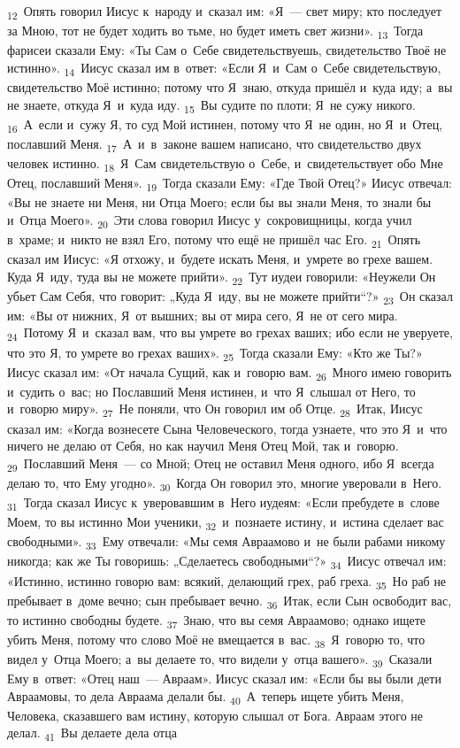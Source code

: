 \documentclass[a4paper,12pt]{article}
\begin{document}
\textsubscript{12}~Опять говорил Иисус к~народу и~сказал им: «Я~--- свет миру; кто последует за Мною, тот не будет ходить во тьме, но будет иметь свет жизни». \textsubscript{13}~Тогда фарисеи сказали Ему: «Ты Сам о~Себе свидетельствуешь, свидетельство Твоё не истинно». \textsubscript{14}~Иисус сказал им в~ответ: «Если Я~и~Сам о~Себе свидетельствую, свидетельство Моё истинно; потому что Я~знаю, откуда пришёл и~куда иду; а~вы не знаете, откуда Я~и~куда иду. \textsubscript{15}~Вы судите по плоти; Я~не сужу никого. \textsubscript{16}~А~если и~сужу Я, то суд Мой истинен, потому что Я~не один, но Я~и~Отец, пославший Меня. \textsubscript{17}~А~и~в~законе вашем написано, что свидетельство двух человек истинно. \textsubscript{18}~Я~Сам свидетельствую о~Себе, и~свидетельствует обо Мне Отец, пославший Меня». \textsubscript{19}~Тогда сказали Ему: «Где Твой Отец?» Иисус отвечал: «Вы не знаете ни Меня, ни Отца Моего; если бы вы знали Меня, то знали бы и~Отца Моего». \textsubscript{20}~Эти слова говорил Иисус у~сокровищницы, когда учил в~храме; и~никто не взял Его, потому что ещё не пришёл час Его. \textsubscript{21}~Опять сказал им Иисус: «Я отхожу, и~будете искать Меня, и~умрете во грехе вашем. Куда Я~иду, туда вы не можете прийти». \textsubscript{22}~Тут иудеи говорили: «Неужели Он убьет Сам Себя, что говорит: „Куда Я~иду, вы не можете прийти“?» \textsubscript{23}~Он сказал им: «Вы от нижних, Я~от вышних; вы от мира сего, Я~не от сего мира. \textsubscript{24}~Потому Я~и~сказал вам, что вы умрете во грехах ваших; ибо если не уверуете, что это Я, то умрете во грехах ваших». \textsubscript{25}~Тогда сказали Ему: «Кто же Ты?» Иисус сказал им: «От начала Сущий, как и~говорю вам. \textsubscript{26}~Много имею говорить и~судить о~вас; но Пославший Меня истинен, и~что Я~слышал от Него, то и~говорю миру». \textsubscript{27}~Не поняли, что Он говорил им об Отце. \textsubscript{28}~Итак, Иисус сказал им: «Когда вознесете Сына Человеческого, тогда узнаете, что это Я~и~что ничего не делаю от Себя, но как научил Меня Отец Мой, так и~говорю. \textsubscript{29}~Пославший Меня~--- со Мной; Отец не оставил Меня одного, ибо Я~всегда делаю то, что Ему угодно». \textsubscript{30}~Когда Он говорил это, многие уверовали в~Него. \textsubscript{31}~Тогда сказал Иисус к~уверовавшим в~Него иудеям: «Если пребудете в~слове Моем, то вы истинно Мои ученики, \textsubscript{32}~и~познаете истину, и~истина сделает вас свободными». \textsubscript{33}~Ему отвечали: «Мы семя Авраамово и~не были рабами никому никогда; как же Ты говоришь: „Сделаетесь свободными“?» \textsubscript{34}~Иисус отвечал им: «Истинно, истинно говорю вам: всякий, делающий грех, раб греха. \textsubscript{35}~Но раб не пребывает в~доме вечно; сын пребывает вечно. \textsubscript{36}~Итак, если Сын освободит вас, то истинно свободны будете. \textsubscript{37}~Знаю, что вы семя Авраамово; однако ищете убить Меня, потому что слово Моё не вмещается в~вас. \textsubscript{38}~Я~говорю то, что видел у~Отца Моего; а~вы делаете то, что видели у~отца вашего». \textsubscript{39}~Сказали Ему в~ответ: «Отец наш~--- Авраам». Иисус сказал им: «Если бы вы были дети Авраамовы, то дела Авраама делали бы. \textsubscript{40}~А~теперь ищете убить Меня, Человека, сказавшего вам истину, которую слышал от Бога. Авраам этого не делал. \textsubscript{41}~Вы делаете дела отца 
\end{document}
